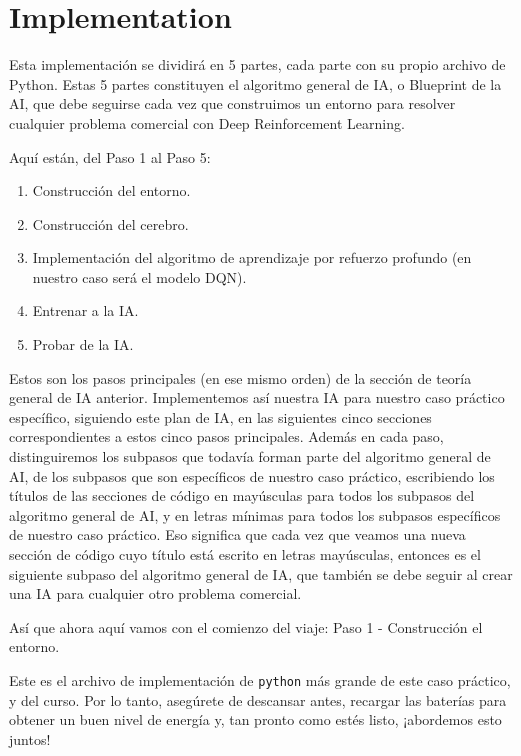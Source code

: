 \documentclass[]{book}
\providecommand{\tightlist}{%
  \setlength{\itemsep}{0pt}\setlength{\parskip}{0pt}}
\begin{document}
\hypertarget{implementation}{%
\section{Implementation}\label{implementation}}

Esta implementación se dividirá en 5 partes, cada parte con su propio archivo de Python. Estas 5 partes constituyen el algoritmo general de IA, o Blueprint de la AI, que debe seguirse cada vez que construimos un entorno para resolver cualquier problema comercial con Deep Reinforcement Learning.

Aquí están, del Paso 1 al Paso 5:

\begin{enumerate}
\def\labelenumi{\arabic{enumi}.}
\tightlist
\item
  Construcción del entorno.
\item
  Construcción del cerebro.
\item
  Implementación del algoritmo de aprendizaje por refuerzo profundo (en nuestro caso será el modelo DQN).
\item
  Entrenar a la IA.
\item
  Probar de la IA.
\end{enumerate}

Estos son los pasos principales (en ese mismo orden) de la sección de teoría general de IA anterior. Implementemos así nuestra IA para nuestro caso práctico específico, siguiendo este plan de IA, en las siguientes cinco secciones correspondientes a estos cinco pasos principales. Además en cada paso, distinguiremos los subpasos que todavía forman parte del algoritmo general de AI, de los subpasos que son específicos de nuestro caso práctico, escribiendo los títulos de las secciones de código en mayúsculas para todos los subpasos del algoritmo general de AI, y en letras mínimas para todos los subpasos específicos de nuestro caso práctico. Eso significa que cada vez que veamos una nueva sección de código cuyo título está escrito en letras mayúsculas, entonces es el siguiente subpaso del algoritmo general de IA, que también se debe seguir al crear una IA para cualquier otro problema comercial.

Así que ahora aquí vamos con el comienzo del viaje: Paso 1 - Construcción el entorno.

Este es el archivo de implementación de \texttt{python} más grande de este caso práctico, y del curso. Por lo tanto, asegúrete de descansar antes, recargar las baterías para obtener un buen nivel de energía y, tan pronto como estés listo, ¡abordemos esto juntos!
\end{document}
